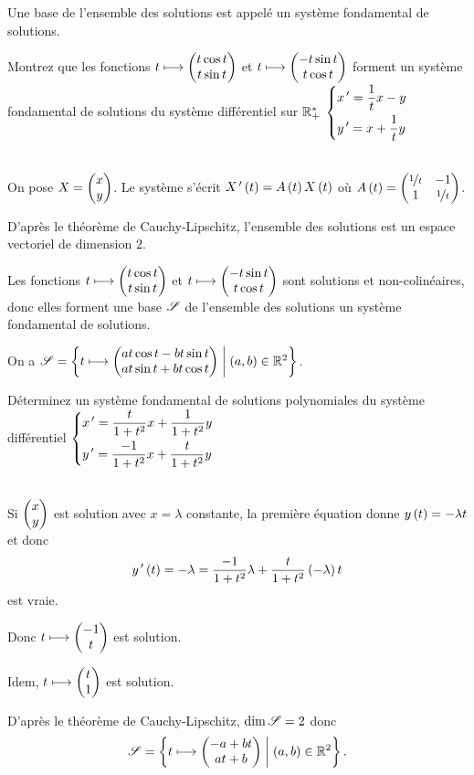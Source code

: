 Une base de l'ensemble des solutions est appelé un système fondamental de solutions.

\begin{exo}
Montrez que les fonctions \(t\longmapsto\begin{pmatrix}t\cos t\\t\sin t\end{pmatrix}\) et \(t\longmapsto\begin{pmatrix}-t\sin t\\t\cos t\end{pmatrix}\) forment un système fondamental de solutions du système différentiel sur \(\mathbb{R}_+^*\) \(\begin{dcases}
    x^{\,\prime}=\dfrac{1}{t}x-y \\
    y^{\,\prime}=x+\dfrac{1}{t}y
\end{dcases}\)
\end{exo}

\begin{corr}~\\
On pose \(X=\begin{pmatrix}x\\y\end{pmatrix}\). Le système s'écrit \(X^{\,\prime}\left(t\right)=A\left(t\right)X\left(t\right)\) où \(A\left(t\right)=\begin{pmatrix}
\nicefrac{1}{t} & -1 \\
1 & \nicefrac{1}{t}
\end{pmatrix}\).

D'après le théorème de Cauchy-Lipschitz, l'ensemble des solutions est un espace vectoriel de dimension \(2\).

Les fonctions \(t\longmapsto\begin{pmatrix}t\cos t\\t\sin t\end{pmatrix}\) et \(t\longmapsto\begin{pmatrix}-t\sin t\\t\cos t\end{pmatrix}\) sont solutions et non-colinéaires, donc elles forment une base \(\mathscr{S}\) de l'ensemble des solutions \ie un système fondamental de solutions.

On a \(\mathscr{S}=\left\lbrace t\longmapsto\begin{pmatrix}at\cos t-bt\sin t\\at\sin t+bt\cos t\end{pmatrix}\;\middle|\;\left(a,b\right)\in\mathbb{R}^2\right\rbrace\).
\end{corr}

\begin{exo}
Déterminez un système fondamental de solutions polynomiales du système \\ différentiel \(\begin{dcases}
    x^{\,\prime}=\dfrac{t}{1+t^2}x+\dfrac{1}{1+t^2}y \\
    y^{\,\prime}=\dfrac{-1}{1+t^2}x+\dfrac{t}{1+t^2}y
\end{dcases}\)
\end{exo}

\begin{corr}~\\
Si \(\begin{pmatrix}x\\y\end{pmatrix}\) est solution avec \(x=\lambda\) constante, la première équation donne \(y\left(t\right)=-\lambda t\) et donc \[y^{\,\prime}\left(t\right)=-\lambda=\dfrac{-1}{1+t^2}\lambda+\dfrac{t}{1+t^2}\left(-\lambda\right)t\] est vraie.

Donc \(t\longmapsto\begin{pmatrix}-1\\t\end{pmatrix}\) est solution.

Idem, \(t\longmapsto\begin{pmatrix}t\\1\end{pmatrix}\) est solution.

D'après le théorème de Cauchy-Lipschitz, \(\dim\mathscr{S}=2\) donc \[\mathscr{S}=\left\lbrace t\longmapsto\begin{pmatrix}-a+bt\\at+b\end{pmatrix}\;\middle|\;\left(a,b\right)\in\mathbb{R}^2\right\rbrace.\]
\end{corr}

